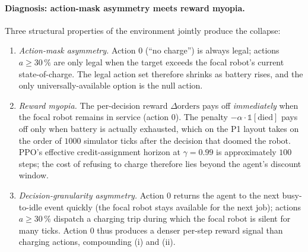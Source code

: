 \documentclass[conference]{IEEEtran}
\begin{document}
\paragraph{Diagnosis: action-mask asymmetry meets reward myopia.}
Three structural properties of the environment jointly produce the collapse:
\begin{enumerate}
  \item \emph{Action-mask asymmetry.} Action $0$ (``no charge'') is always legal; actions $a\!\ge\!30\,\%$ are only legal when the target exceeds the focal robot's current state-of-charge. The legal action set therefore shrinks as battery rises, and the only universally-available option is the null action.
  \item \emph{Reward myopia.} The per-decision reward $\Delta\text{orders}$ pays off \emph{immediately} when the focal robot remains in service (action 0). The penalty $-\alpha\!\cdot\!\mathbb{1}[\text{died}]$ pays off only when battery is actually exhausted, which on the P1 layout takes on the order of $1000$ simulator ticks after the decision that doomed the robot. PPO's effective credit-assignment horizon at $\gamma=0.99$ is approximately $100$ steps; the cost of refusing to charge therefore lies beyond the agent's discount window.
  \item \emph{Decision-granularity asymmetry.} Action 0 returns the agent to the next busy-to-idle event quickly (the focal robot stays available for the next job); actions $a\!\ge\!30\,\%$ dispatch a charging trip during which the focal robot is silent for many ticks. Action 0 thus produces a denser per-step reward signal than charging actions, compounding (i) and (ii).
\end{enumerate}
\end{document}
